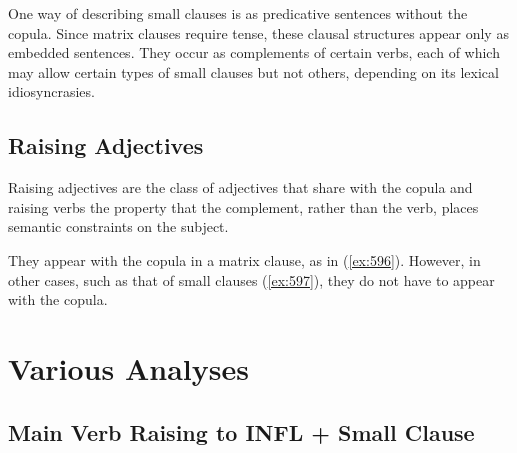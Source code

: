 One way of describing small clauses is as predicative sentences without the 
copula.  Since matrix clauses require tense, these clausal structures appear 
only as embedded sentences.  They occur as complements of certain verbs, each 
of which may allow certain types of small clauses but not others, depending on its 
lexical idiosyncrasies. 
 
\beginsentences
{}\label{ex:594} 
\endsentences

 
\beginsentences
{}\label{ex:595} 
\endsentences

 
 
\subsection{Raising Adjectives} 
\label{raising-adjs} 
 
Raising adjectives are the class of adjectives that 
share with the copula and raising verbs the property 
that the complement, rather than the verb, places semantic constraints on 
the subject.  
 
They appear with the copula in a matrix clause, as in ({\ref{ex:596}}).  However, 
in other cases, such as that of small clauses ({\ref{ex:597}}), they do not 
have to appear with the copula. 
 
\beginsentences
{}\label{ex:596} 
\endsentences

 
\beginsentences
{}\label{ex:597} 
\endsentences

 
 
 
\section{Various Analyses} 
\label{sm-clause-other-analyses} 
 
\subsection{Main Verb Raising to INFL + Small Clause} 
 
